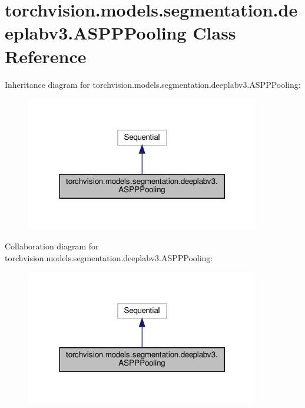 \hypertarget{classtorchvision_1_1models_1_1segmentation_1_1deeplabv3_1_1ASPPPooling}{}\section{torchvision.\+models.\+segmentation.\+deeplabv3.\+A\+S\+P\+P\+Pooling Class Reference}
\label{classtorchvision_1_1models_1_1segmentation_1_1deeplabv3_1_1ASPPPooling}


Inheritance diagram for torchvision.\+models.\+segmentation.\+deeplabv3.\+A\+S\+P\+P\+Pooling\+:
\nopagebreak
\begin{figure}[H]
\begin{center}
\leavevmode
\includegraphics[width=290pt]{classtorchvision_1_1models_1_1segmentation_1_1deeplabv3_1_1ASPPPooling__inherit__graph}
\end{center}
\end{figure}


Collaboration diagram for torchvision.\+models.\+segmentation.\+deeplabv3.\+A\+S\+P\+P\+Pooling\+:
\nopagebreak
\begin{figure}[H]
\begin{center}
\leavevmode
\includegraphics[width=290pt]{classtorchvision_1_1models_1_1segmentation_1_1deeplabv3_1_1ASPPPooling__coll__graph}
\end{center}
\end{figure}

